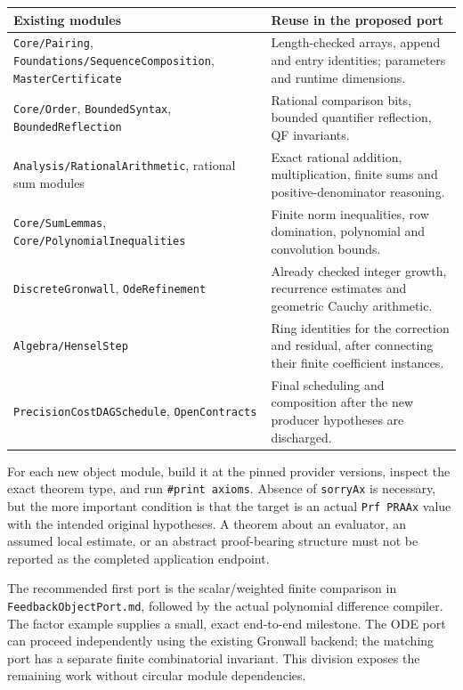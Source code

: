 \begin{longtable}{>{\raggedright\arraybackslash}p{}>{\raggedright\arraybackslash}p{}}
\toprule Existing modules & Reuse in the proposed port\\\midrule\endhead
\nolinkurl{Core/Pairing}, \nolinkurl{Foundations/SequenceComposition}, \nolinkurl{MasterCertificate} & Length-checked arrays, append and entry identities; parameters and runtime dimensions.\\
\texttt{Core/Order}, \nolinkurl{BoundedSyntax}, \nolinkurl{BoundedReflection} & Rational comparison bits, bounded quantifier reflection, QF invariants.\\
\nolinkurl{Analysis/RationalArithmetic}, rational sum modules & Exact rational addition, multiplication, finite sums and positive-denominator reasoning.\\
\nolinkurl{Core/SumLemmas}, \nolinkurl{Core/PolynomialInequalities} & Finite norm inequalities, row domination, polynomial and convolution bounds.\\
\nolinkurl{DiscreteGronwall}, \nolinkurl{OdeRefinement} & Already checked integer growth, recurrence estimates and geometric Cauchy arithmetic.\\
\nolinkurl{Algebra/HenselStep} & Ring identities for the correction and residual, after connecting their finite coefficient instances.\\
\nolinkurl{PrecisionCostDAGSchedule}, \nolinkurl{OpenContracts} & Final scheduling and composition after the new producer hypotheses are discharged.\\
\bottomrule
\end{longtable}

For each new object module, build it at the pinned provider versions, inspect the exact theorem type, and run \texttt{\#print axioms}. Absence of \texttt{sorryAx} is necessary, but the more important condition is that the target is an actual \texttt{Prf PRAAx} value with the intended original hypotheses. A theorem about an evaluator, an assumed local estimate, or an abstract proof-bearing structure must not be reported as the completed application endpoint.

The recommended first port is the scalar/weighted finite comparison in \nolinkurl{FeedbackObjectPort.md}, followed by the actual polynomial difference compiler. The factor example supplies a small, exact end-to-end milestone. The ODE port can proceed independently using the existing Gronwall backend; the matching port has a separate finite combinatorial invariant. This division exposes the remaining work without circular module dependencies.

